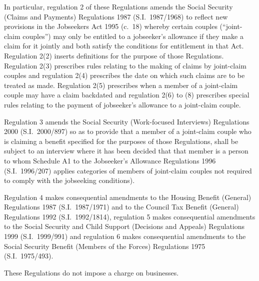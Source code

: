 \documentclass[12pt,a4paper]{article}
\begin{document}
In particular, regulation 2 of these Regulations amends the Social Security (Claims and Payments) Regulations 1987 (S.I.\ 1987/1968) to reflect new provisions in the Jobseekers Act 1995 (c.\ 18) whereby certain couples (“joint-claim couples”) may only be entitled to a jobseeker’s allowance if they make a claim for it jointly and both satisfy the conditions for entitlement in that Act. Regulation 2(2) inserts definitions for the purpose of those Regulations. Regulation 2(3) prescribes rules relating to the making of claims by joint-claim couples and regulation 2(4) prescribes the date on which such claims are to be treated as made. Regulation 2(5) prescribes when a member of a joint-claim couple may have a claim backdated and regulation 2(6) to (8) prescribes special rules relating to the payment of jobseeker’s allowance to a joint-claim couple.

Regulation 3 amends the Social Security (Work-focused Interviews) Regulations 2000 (S.I.\ 2000/897) so as to provide that a member of a joint-claim couple who is claiming a benefit specified for the purposes of those Regulations, shall be subject to an interview where it has been decided that that member is a person to whom Schedule A1 to the Jobseeker’s Allowance Regulations 1996 (S.I.\ 1996/207) applies categories of members of joint-claim couples not required to comply with the jobseeking conditions).

Regulation 4 makes consequential amendments to the Housing Benefit (General) Regulations 1987 (S.I.\ 1987/1971) and to the Council Tax Benefit (General) Regulations 1992 (S.I.\ 1992/1814), regulation 5 makes consequential amendments to the Social Security and Child Support (Decisions and Appeals) Regulations 1999 (S.I.\ 1999/991) and regulation 6 makes consequential amendments to the Social Security Benefit (Members of the Forces) Regulations 1975 (S.I.\ 1975/493).

These Regulations do not impose a charge on businesses. 
\end{document}
